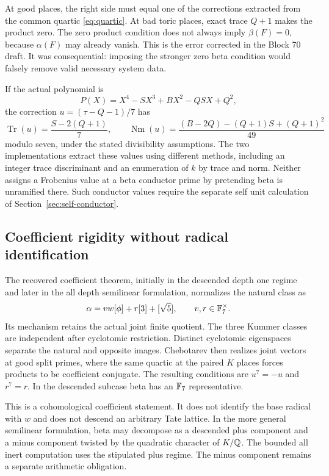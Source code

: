 At good places, the right side must equal one of the corrections extracted from the common quartic \eqref{eq:quartic}. At bad toric places, exact trace $Q+1$ makes the product zero. The zero product condition does not always imply $\beta(F)=0$, because $\alpha(F)$ may already vanish. This is the error corrected in the Block 70 draft. It was consequential: imposing the stronger zero beta condition would falsely remove valid necessary system data.

If the actual polynomial is
\[
P(X)=X^4-SX^3+BX^2-QSX+Q^2,
\]
the correction $u=(\tau-Q-1)/7$ has
\[
\operatorname{Tr}(u)=\frac{S-2(Q+1)}7,\qquad
\operatorname{Nm}(u)=\frac{(B-2Q)-(Q+1)S+(Q+1)^2}{49}
\]
modulo seven, under the stated divisibility assumptions. The two implementations extract these values using different methods, including an integer trace discriminant and an enumeration of $k$ by trace and norm. Neither assigns a Frobenius value at a beta conductor prime by pretending beta is unramified there. Such conductor values require the separate self unit calculation of Section~\ref{sec:self-conductor}.

\subsection{Coefficient rigidity without radical identification}
The recovered coefficient theorem, initially in the descended depth one regime and later in the all depth semilinear formulation, normalizes the natural class as
\begin{equation}\label{eq:rigidalpha}
\alpha=vw[\phi]+r[3]+[\sqrt5],\qquad v,r\in\mathbb F_7^\times.
\end{equation}
Its mechanism retains the actual joint finite quotient. The three Kummer classes are independent after cyclotomic restriction. Distinct cyclotomic eigenspaces separate the natural and opposite images. Chebotarev then realizes joint vectors at good split primes, where the same quartic at the paired $K$ places forces products to be coefficient conjugate. The resulting conditions are $u^7=-u$ and $r^7=r$. In the descended subcase beta has an $\mathbb F_7$ representative.

This is a cohomological coefficient statement. It does not identify the base radical with $w$ and does not descend an arbitrary Tate lattice. In the more general semilinear formulation, beta may decompose as a descended plus component and a minus component twisted by the quadratic character of $K/\mathbb Q$. The bounded all inert computation uses the stipulated plus regime. The minus component remains a separate arithmetic obligation.
